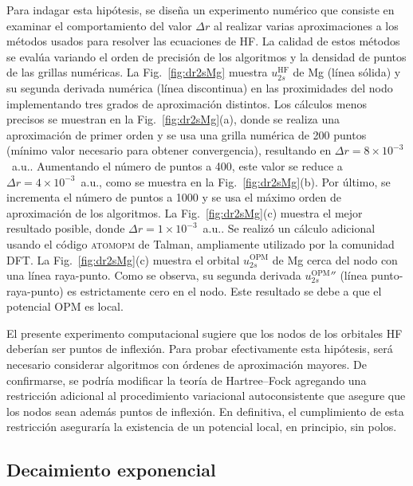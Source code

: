 Para indagar esta hipótesis, se diseña un experimento numérico que 
consiste en examinar el comportamiento del valor $\Delta r$ al realizar 
varias aproximaciones a los métodos usados para resolver las 
ecuaciones de HF. La calidad de estos métodos se evalúa variando el 
orden de precisión de los algoritmos y la densidad de puntos de las 
grillas numéricas. La Fig.~\ref{fig:dr2sMg} muestra 
$u_{2s}^{\mathrm{HF}}$ de Mg (línea sólida) y su segunda derivada 
numérica (línea discontinua) en las proximidades del nodo implementando 
tres grados de aproximación distintos. Los cálculos menos precisos se 
muestran en la Fig.~\ref{fig:dr2sMg}(a), donde se realiza una 
aproximación de primer orden y se usa una grilla numérica de 200 puntos 
(mínimo valor necesario para obtener convergencia), resultando en 
$\Delta r=8\times 10^{-3}$~a.u.. Aumentando el número de puntos a 400, 
este valor se reduce a $\Delta r=4\times 10^{-3}$~a.u., como se muestra 
en la Fig.~\ref{fig:dr2sMg}(b). Por último, se incrementa el número de 
puntos a 1000 y se usa el máximo orden de aproximación de los 
algoritmos. La Fig.~\ref{fig:dr2sMg}(c) muestra el mejor resultado 
posible, donde $\Delta r=1\times 10^{-3}$~a.u.. Se realizó un cálculo 
adicional usando el código \textsc{atomopm} de Talman, ampliamente 
utilizado por la comunidad DFT. La Fig.~\ref{fig:dr2sMg}(c) muestra el 
orbital $u_{2s}^{\mathrm{OPM}}$ de Mg cerca del nodo con una línea 
raya-punto. Como se observa, su segunda derivada 
$u_{2s}^{\mathrm{OPM}}''$ (línea punto-raya-punto) es estrictamente cero 
en el nodo. Este resultado se debe a que el potencial OPM es local. 

El presente experimento computacional sugiere que los nodos de los 
orbitales HF deberían ser puntos de inflexión. Para probar efectivamente 
esta hipótesis, será necesario considerar algoritmos con órdenes de 
aproximación mayores. De confirmarse, se podría modificar la teoría de 
Hartree--Fock agregando una restricción adicional al procedimiento 
variacional autoconsistente que asegure que los nodos sean además puntos 
de inflexión. En definitiva, el cumplimiento de esta restricción 
aseguraría la existencia de un potencial local, en principio, sin polos. 

\subsection{Decaimiento exponencial}
\label{subsec:decaimientoHF}

